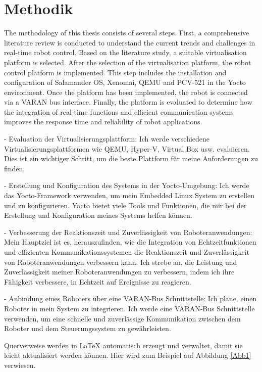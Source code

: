 \documentclass[MMR,Master,english]{twbook}
\begin{document}
\clearpage
\chapter{Methodik}

The methodology of this thesis consists of several steps. First, a comprehensive literature review is conducted to understand the current trends and challenges in real-time robot control. Based on the literature study, a suitable virtualisation platform is selected. After the selection of the virtualisation platform, the robot control platform is implemented. This step includes the installation and configuration of Salamander OS, Xenomai, QEMU and PCV-521 in the Yocto environment. Once the platform has been implemented, the robot is connected via a VARAN bus interface. Finally, the platform is evaluated to determine how the integration of real-time functions and efficient communication systems improves the response time and reliability of robot applications.




- Evaluation der Virtualisierungsplattform: 
Ich werde verschiedene Virtualisierungsplattformen wie QEMU, Hyper-V, Virtual Box usw. evaluieren. Dies ist ein wichtiger Schritt, um die beste Plattform für meine Anforderungen zu finden.
  
- Erstellung und Konfiguration des Systems in der Yocto-Umgebung: 
Ich werde das Yocto-Framework verwenden, um mein Embedded Linux System zu erstellen und zu konfigurieren. Yocto bietet viele Tools und Funktionen, die mir bei der Erstellung und Konfiguration meines Systems helfen können.

- Verbesserung der Reaktionszeit und Zuverlässigkeit von Roboteranwendungen: 
Mein Hauptziel ist es, herauszufinden, wie die Integration von Echtzeitfunktionen und effizienten Kommunikationssystemen die Reaktionszeit und Zuverlässigkeit von Roboteranwendungen verbessern kann. Ich strebe an, die Leistung und Zuverlässigkeit meiner Roboteranwendungen zu verbessern, indem ich ihre Fähigkeit verbessere, in Echtzeit auf Ereignisse zu reagieren.

- Anbindung eines Roboters über eine VARAN-Bus Schnittstelle:
Ich plane, einen Roboter in mein System zu integrieren. Ich werde eine VARAN-Bus Schnittstelle verwenden, um eine schnelle und zuverlässige Kommunikation zwischen dem Roboter und dem Steuerungssystem zu gewährleisten.


\noindent Querverweise werden in \LaTeX{} automatisch erzeugt und verwaltet, damit sie leicht aktualisiert werden können. Hier wird zum Beispiel auf Abbildung \ref{Abb1} verwiesen.
\end{document}
